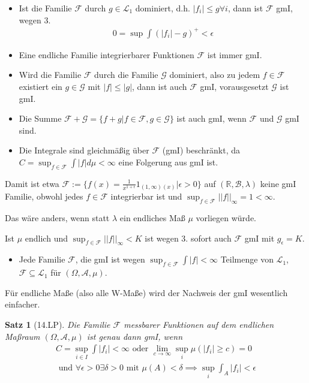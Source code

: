 \documentclass[]{article}
\newtheorem{theorem}{Satz}
\begin{document}
\begin{itemize}
	\item Ist die Familie $\mathcal{F}$ durch $g\in \mathcal{L}_1$ dominiert, d.h. $|f_i| \leq g \forall i$, dann ist $\mathcal{F}$ gmI, wegen 3.
	\begin{align*}
		0 = \sup \int (|f_i| - g)^+ < \epsilon
	\end{align*}

	\item Eine endliche Familie integrierbarer Funktionen $\mathcal{F}$ ist immer gmI.
	
	\item Wird die Familie $\mathcal{F}$ durch die Familie $\mathcal{G}$ dominiert, also zu jedem $f\in \mathcal{F}$ existiert ein $g \in \mathcal{G}$ mit $|f|\leq |g|$, dann ist auch $\mathcal{F}$ gmI, vorausgesetzt $\mathcal{G}$ ist gmI.
	
	\item Die Summe $\mathcal{F} + \mathcal{G} = \{f+g|f\in \mathcal{F}, g \in \mathcal{G}\}$ ist auch gmI, wenn $\mathcal{F}$ und $\mathcal{G}$ gmI sind.
	
	\item Die Integrale sind gleichmäßig über $\mathcal{F}$ (gmI) beschränkt, da $C = \sup_{f\in\mathcal{F}} \int |f| d\mu < \infty$ eine Folgerung aus gmI ist.
\end{itemize}

Damit ist etwa $\mathcal{F}:= \{f(x)=\frac{1}{x^{1+\epsilon}} 1_{(1,\infty)(x)} | \epsilon > 0\}$ auf $(\mathbb{R}, \mathcal{B}, \lambda)$ keine gmI Familie, obwohl jedes $f \in \mathcal{F}$ integrierbar ist und $\sup_{f\in\mathcal{F}} ||f||_\infty = 1 < \infty$.

Das wäre anders, wenn statt $\lambda$ ein endliches Maß $\mu$ vorliegen würde.

Ist $\mu$ endlich und $\sup_{f\in\mathcal{F}} ||f||_\infty < K$ ist wegen 3. sofort auch $\mathcal{F}$ gmI mit $g_\epsilon = K$.

\begin{itemize}
	\item Jede Familie $\mathcal{F}$, die gmI ist wegen $\sup_{f\in\mathcal{F}} \int |f| < \infty$ Teilmenge von $\mathcal{L}_1$, $\mathcal{F} \subseteq \mathcal{L}_1$ für $(\Omega, \mathcal{A}, \mu)$.
\end{itemize}

Für endliche Maße (also alle W-Maße) wird der Nachweis der gmI wesentlich einfacher.

\begin{theorem}[14.LP]
	Die Familie $\mathcal{F}$ messbarer Funktionen auf dem endlichen Maßraum $(\Omega, \mathcal{A}, \mu)$ ist genau dann gmI, wenn
	\begin{align*}
		C=\sup_{i\in I} \int |f_i| < \infty \text{ oder } \lim\limits_{c\rightarrow\infty} \sup_i \mu(|f_i| \geq c) = 0 \\
		\text{ und } \forall \epsilon > 0 \exists \delta > 0 \text{ mit } \mu(A) < \delta \implies \sup_i \int_A |f_i| < \epsilon
	\end{align*}
\end{theorem}
\end{document}
